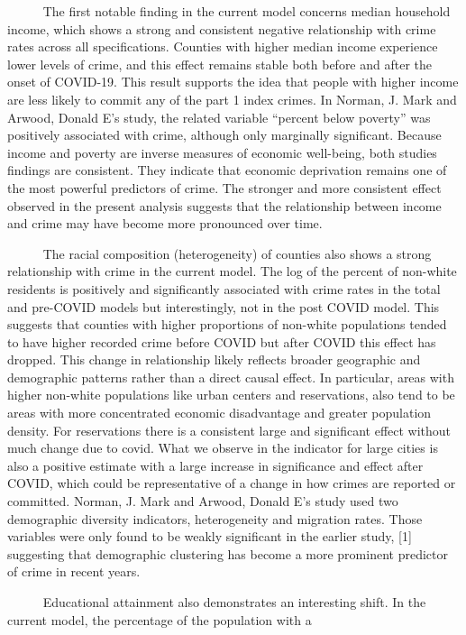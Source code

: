 \documentclass[
  11pt,
  letterpaper,
  DIV=11,
  numbers=noendperiod]{scrartcl}
\begin{document}
~~~~~ The first notable finding in the current model concerns median
household income, which shows a strong and consistent negative
relationship with crime rates across all specifications. Counties with
higher median income experience lower levels of crime, and this effect
remains stable both before and after the onset of COVID-19. This result
supports the idea that people with higher income are less likely to
commit any of the part 1 index crimes. In Norman, J. Mark and Arwood,
Donald E's study, the related variable ``percent below poverty'' was
positively associated with crime, although only marginally significant.
Because income and poverty are inverse measures of economic well-being,
both studies findings are consistent. They indicate that economic
deprivation remains one of the most powerful predictors of crime. The
stronger and more consistent effect observed in the present analysis
suggests that the relationship between income and crime may have become
more pronounced over time.\\
\strut ~~~~~ The racial composition (heterogeneity) of counties also
shows a strong relationship with crime in the current model. The log of
the percent of non-white residents is positively and significantly
associated with crime rates in the total and pre-COVID models but
interestingly, not in the post COVID model. This suggests that counties
with higher proportions of non-white populations tended to have higher
recorded crime before COVID but after COVID this effect has dropped.
This change in relationship likely reflects broader geographic and
demographic patterns rather than a direct causal effect. In particular,
areas with higher non-white populations like urban centers and
reservations, also tend to be areas with more concentrated economic
disadvantage and greater population density. For reservations there is a
consistent large and significant effect without much change due to
covid. What we observe in the indicator for large cities is also a
positive estimate with a large increase in significance and effect after
COVID, which could be representative of a change in how crimes are
reported or committed. Norman, J. Mark and Arwood, Donald E's study used
two demographic diversity indicators, heterogeneity and migration rates.
Those variables were only found to be weakly significant in the earlier
study, {[}1{]} suggesting that demographic clustering has become a more
prominent predictor of crime in recent years.\\
\strut ~~~~~ Educational attainment also demonstrates an interesting
shift. In the current model, the percentage of the population with a
\end{document}
